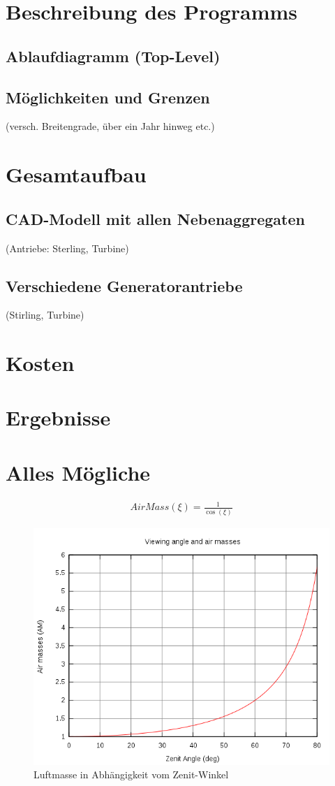 \documentclass[fontsize=10pt,paper=a4,bibliography=totoc]{scrartcl}
\begin{document}
\section{Beschreibung des Programms}
\subsection{Ablaufdiagramm (Top-Level)}
\subsection{Möglichkeiten und Grenzen}
 (versch. Breitengrade, über ein Jahr hinweg etc.)
\section{Gesamtaufbau}
\subsection{CAD-Modell mit allen Nebenaggregaten}
 (Antriebe: Sterling, Turbine)
\subsection{Verschiedene Generatorantriebe}
 (Stirling, Turbine)
\section{Kosten}
\section{Ergebnisse}


\section{Alles Mögliche}

\begin{align*}
	AirMass(\xi)=\frac{1}{\cos(\xi)}
\end{align*}

\begin{figure}
	\centering
	\includegraphics{images/Airmass.png}
	\caption{Luftmasse in Abhängigkeit vom Zenit-Winkel}
	\label{pic:AirMass}
\end{figure}
\end{document}
